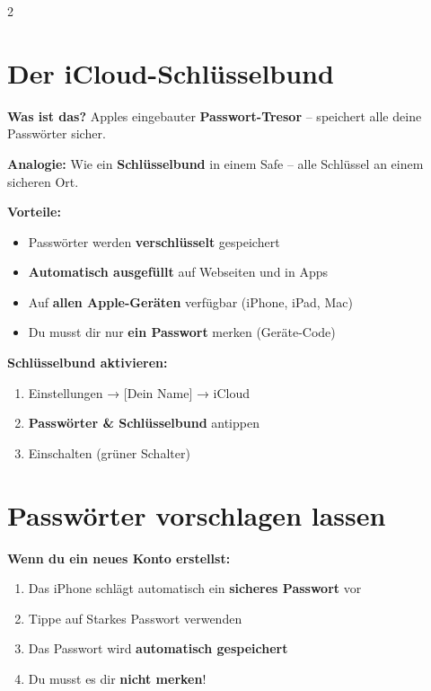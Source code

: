 \documentclass[a4paper,landscape,8pt]{extarticle}
\begin{document}
\begin{multicols}{2}

\section*{\textcolor{keyblue}{Der iCloud-Schlüsselbund}}

\textbf{Was ist das?} Apples eingebauter \textbf{Passwort-Tresor} -- speichert alle deine Passwörter sicher.

\textbf{Analogie:} Wie ein \textbf{Schlüsselbund} in einem Safe -- alle Schlüssel an einem sicheren Ort.

\vspace{2mm}

\textbf{Vorteile:}
\begin{itemize}
\item Passwörter werden \textbf{verschlüsselt} gespeichert
\item \textbf{Automatisch ausgefüllt} auf Webseiten und in Apps
\item Auf \textbf{allen Apple-Geräten} verfügbar (iPhone, iPad, Mac)
\item Du musst dir nur \textbf{ein Passwort} merken (Geräte-Code)
\end{itemize}

\textbf{Schlüsselbund aktivieren:}
\begin{enumerate}
\item Einstellungen → [Dein Name] → iCloud
\item \textbf{Passwörter \& Schlüsselbund} antippen
\item Einschalten (grüner Schalter)
\end{enumerate}

\vspace{3mm}

\section*{\textcolor{lockgreen}{Passwörter vorschlagen lassen}}

\textbf{Wenn du ein neues Konto erstellst:}
\begin{enumerate}
\item Das iPhone schlägt automatisch ein \textbf{sicheres Passwort} vor
\item Tippe auf \glqq Starkes Passwort verwenden\grqq{}
\item Das Passwort wird \textbf{automatisch gespeichert}
\item Du musst es dir \textbf{nicht merken}!
\end{enumerate}


\end{multicols}
\end{document}
